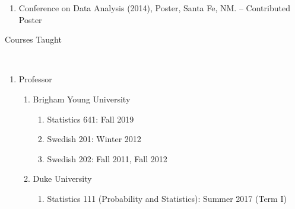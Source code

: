 \documentclass[11pt]{article}
\newcommand{\head}[1]{ %
    \bigskip %
    \begin{large}\begin{bf}{#1}\end{bf}\end{large} %

    \ \\ [-1.3cm] %

    \hrulefill}
\begin{document}
\begin{enumerate}[label=$\bullet$]
\begin{enumerate}[label=$\cdot$]
\item Conference on Data Analysis (2014), Poster, Santa Fe, NM. -- Contributed Poster
\end{enumerate}
\end{enumerate}

\head{Courses Taught}

\begin{enumerate}[label=$\bullet$]
\item Professor
\begin{enumerate}[label=$\cdot$]
\item Brigham Young University
\begin{enumerate}[label=$\cdot$]
\item Statistics 641: Fall 2019
\item Swedish 201: Winter 2012 
\item Swedish 202: Fall 2011, Fall 2012
\end{enumerate}
\item Duke University
\begin{enumerate}[label=$\cdot$]
\item Statistics 111 (Probability and Statistics): Summer 2017 (Term I)
\end{enumerate}
\end{enumerate}
\end{enumerate}
\end{document}
